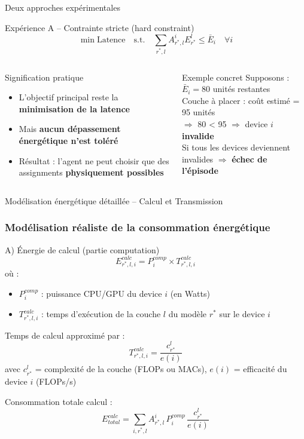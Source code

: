 \documentclass[aspectratio=169]{beamer}
\begin{document}
\begin{frame}{Deux approches expérimentales}
\begin{block}{Expérience A – Contrainte stricte (hard constraint)}
\[
\min \text{Latence} \quad \text{s.t.} \quad \sum_{r^*,l} A^i_{r^*,l} E^l_{r^*} \le \bar{E}_i \quad \forall i
\]
\end{block}

\begin{columns}[T]
        \begin{block}{Signification pratique}
        \begin{itemize}
            \item L’objectif principal reste la \textbf{minimisation de la latence}
            \item Mais \textbf{aucun dépassement énergétique n’est toléré}
            \item Résultat : l’agent ne peut choisir que des assignments \textbf{physiquement possibles}
        \end{itemize}
        \end{block}
    
        \begin{alertblock}{Exemple concret}
            Supposons : \\
            $\bar{E}_i = 80$ unités restantes \\
            Couche à placer : coût estimé = 95 unités \\
            $\Rightarrow$ 80 < 95 $\Rightarrow$ device $i$ \textbf{invalide} \\
            Si tous les devices deviennent invalides $\Rightarrow$ \textbf{échec de l’épisode}
        \end{alertblock}
    \end{columns}
\end{frame}

\begin{frame}{Modélisation énergétique détaillée – Calcul et Transmission}
\frametitle{Modélisation réaliste de la consommation énergétique}

\begin{block}{A) Énergie de calcul (partie computation)}
\[
E^{calc}_{r^*,l,i} = P_i^{comp} \times T^{calc}_{r^*,l,i}
\]
où :
\begin{itemize}
    \item $P_i^{comp}$ : puissance CPU/GPU du device $i$ (en Watts)
    \item $T^{calc}_{r^*,l,i}$ : temps d'exécution de la couche $l$ du modèle $r^*$ sur le device $i$
\end{itemize}

\small
Temps de calcul approximé par :
\[
T^{calc}_{r^*,l,i} = \frac{c^l_{r^*}}{e(i)}
\]
avec $c^l_{r^*}$ = complexité de la couche (FLOPs ou MACs), $e(i)$ = efficacité du device $i$ (FLOPs/s)

Consommation totale calcul :
\[
E^{calc}_{total} = \sum_{i,r^*,l} A^i_{r^*,l} \, P_i^{comp} \, \frac{c^l_{r^*}}{e(i)}
\]
\end{block}
\end{frame}
\end{document}
